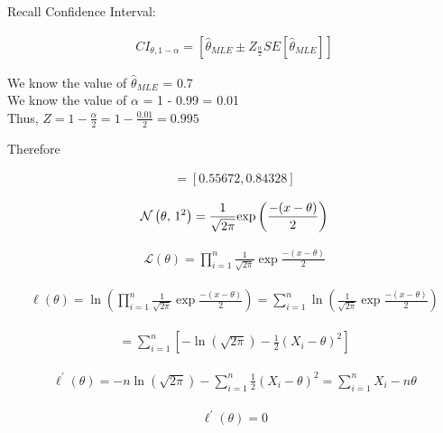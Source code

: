 \documentclass[12pt]{article}
\begin{document}
\begin{enumerate}
Recall Confidence Interval:

\begin{align*}
 CI_{\theta, 1 - \alpha} = [\hat\theta_{MLE} \pm Z_{\frac{\alpha}{2}}SE[\hat\theta_{MLE}]]
\end{align*}

We know the value of $\hat\theta_{MLE}$ = 0.7 \\
We know the value of $\alpha$ = 1 - 0.99 = 0.01 \\ 
Thus, $Z = 1 - \frac{\alpha}{2} = 1 - \frac{0.01}{2} = 0.995$

Therefore

    \begin{align*}
        [0.7 - (0.995)(.144), 0.7 + (0.995)(0.144)] = [0.55672, 0.84328]
    \end{align*}





\begin{align*}
    \mathcal{N}\left(\theta,\,1^2\right) = \frac{1}{\sqrt{2\pi}}\mathrm{exp}\left(\frac{-(x - \theta)}{2}\right) 
\end{align*}


\begin{align*}
    \mathcal{L}(\theta) = \prod\limits_{i = 1}^{n}\frac{1}{\sqrt{2\pi}}\exp{\frac{-(x - \theta)}{2}}
\end{align*}

\begin{align*}
    \ell(\theta) = \ln(\prod\limits_{i=1}^{n}\frac{1}{\sqrt{2\pi}}\exp{\frac{-(x - \theta)}{2}}) = \sum\limits_{i = 1}^{n}\ln(\frac{1}{\sqrt{2\pi}}\exp{\frac{-(x - \theta)}{2}})
\end{align*}

\begin{align*}
    = \sum\limits_{i=1}^{n}[-\ln(\sqrt{2\pi}) - \frac{1}{2}(X_i - \theta)^2]
\end{align*}

\begin{align*}
    \ell^{\prime}(\theta) = -n\ln(\sqrt{2\pi}) - \sum\limits_{i=1}^{n}\frac{1}{2}(X_i - \theta)^{2} = \sum\limits_{i=1}^{n}X_{i} - n\theta
\end{align*}

\begin{align*}
    \ell^{\prime}(\theta) = 0
\end{align*}


\end{enumerate}
\end{document}
